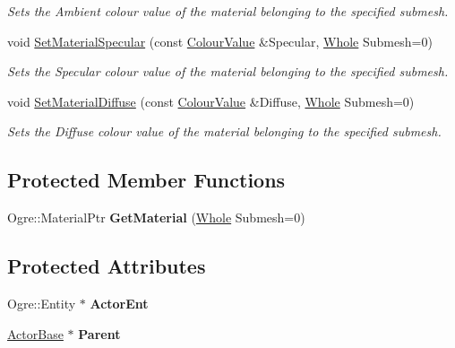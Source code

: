\begin{DoxyCompactItemize}
\begin{DoxyCompactList}\small\item\em Sets the Ambient colour value of the material belonging to the specified submesh. \item\end{DoxyCompactList}\item 
void \hyperlink{classphys_1_1ActorGraphicsSettings_a51bfae72380679093595c1805b1d940b}{SetMaterialSpecular} (const \hyperlink{classphys_1_1ColourValue}{ColourValue} \&Specular, \hyperlink{namespacephys_a460f6bc24c8dd347b05e0366ae34f34a}{Whole} Submesh=0)
\begin{DoxyCompactList}\small\item\em Sets the Specular colour value of the material belonging to the specified submesh. \item\end{DoxyCompactList}\item 
void \hyperlink{classphys_1_1ActorGraphicsSettings_a135bebcafc6a2386aaec61bce7a5e548}{SetMaterialDiffuse} (const \hyperlink{classphys_1_1ColourValue}{ColourValue} \&Diffuse, \hyperlink{namespacephys_a460f6bc24c8dd347b05e0366ae34f34a}{Whole} Submesh=0)
\begin{DoxyCompactList}\small\item\em Sets the Diffuse colour value of the material belonging to the specified submesh. \item\end{DoxyCompactList}\end{DoxyCompactItemize}
\subsection*{Protected Member Functions}
\begin{DoxyCompactItemize}
\item 
\hypertarget{classphys_1_1ActorGraphicsSettings_ade1b760cc01187e9ffdeed8871533066}{
Ogre::MaterialPtr {\bfseries GetMaterial} (\hyperlink{namespacephys_a460f6bc24c8dd347b05e0366ae34f34a}{Whole} Submesh=0)}
\label{dd/dd6/classphys_1_1ActorGraphicsSettings_ade1b760cc01187e9ffdeed8871533066}

\end{DoxyCompactItemize}
\subsection*{Protected Attributes}
\begin{DoxyCompactItemize}
\item 
\hypertarget{classphys_1_1ActorGraphicsSettings_a256f2b713dbfe39007708600e58bf2f7}{
Ogre::Entity $\ast$ {\bfseries ActorEnt}}
\label{dd/dd6/classphys_1_1ActorGraphicsSettings_a256f2b713dbfe39007708600e58bf2f7}

\item 
\hypertarget{classphys_1_1ActorGraphicsSettings_a52f1d57929101944767bf23b003f0975}{
\hyperlink{classphys_1_1ActorBase}{ActorBase} $\ast$ {\bfseries Parent}}
\label{dd/dd6/classphys_1_1ActorGraphicsSettings_a52f1d57929101944767bf23b003f0975}

\end{DoxyCompactItemize}


